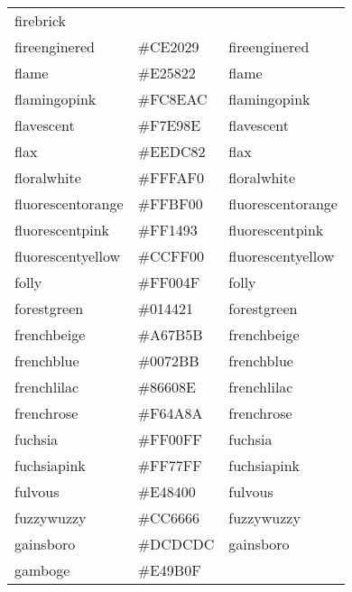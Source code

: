 \documentclass[
]{article}
\begin{document}
\begin{longtable}[]{@{}lll@{}}
\textcolor[rgb]{0.7,0.13,0.13}{firebrick             }\tabularnewline
fireenginered & \colorbox[rgb]{0.81,0.09,0.13}{\#CE2029} &
\textcolor[rgb]{0.81,0.09,0.13}{fireenginered         }\tabularnewline
flame & \colorbox[rgb]{0.89,0.35,0.13}{\#E25822} &
\textcolor[rgb]{0.89,0.35,0.13}{flame                 }\tabularnewline
flamingopink & \colorbox[rgb]{0.99,0.56,0.67}{\#FC8EAC} &
\textcolor[rgb]{0.99,0.56,0.67}{flamingopink          }\tabularnewline
flavescent & \colorbox[rgb]{0.97,0.91,0.56}{\#F7E98E} &
\textcolor[rgb]{0.97,0.91,0.56}{flavescent            }\tabularnewline
flax & \colorbox[rgb]{0.93,0.86,0.51}{\#EEDC82} &
\textcolor[rgb]{0.93,0.86,0.51}{flax                  }\tabularnewline
floralwhite & \colorbox[rgb]{1.0,0.98,0.94}{\#FFFAF0} &
\textcolor[rgb]{1.0,0.98,0.94}{floralwhite           }\tabularnewline
fluorescentorange & \colorbox[rgb]{1.0,0.75,0.0}{\#FFBF00} &
\textcolor[rgb]{1.0,0.75,0.0}{fluorescentorange     }\tabularnewline
fluorescentpink & \colorbox[rgb]{1.0,0.08,0.58}{\#FF1493} &
\textcolor[rgb]{1.0,0.08,0.58}{fluorescentpink       }\tabularnewline
fluorescentyellow & \colorbox[rgb]{0.8,1.0,0.0}{\#CCFF00} &
\textcolor[rgb]{0.8,1.0,0.0}{fluorescentyellow     }\tabularnewline
folly & \colorbox[rgb]{1.0,0.0,0.31}{\#FF004F} &
\textcolor[rgb]{1.0,0.0,0.31}{folly                 }\tabularnewline
forestgreen & \colorbox[rgb]{0.0,0.27,0.13}{\#014421} &
\textcolor[rgb]{0.0,0.27,0.13}{forestgreen           }\tabularnewline
frenchbeige & \colorbox[rgb]{0.65,0.48,0.36}{\#A67B5B} &
\textcolor[rgb]{0.65,0.48,0.36}{frenchbeige           }\tabularnewline
frenchblue & \colorbox[rgb]{0.0,0.45,0.73}{\#0072BB} &
\textcolor[rgb]{0.0,0.45,0.73}{frenchblue            }\tabularnewline
frenchlilac & \colorbox[rgb]{0.53,0.38,0.56}{\#86608E} &
\textcolor[rgb]{0.53,0.38,0.56}{frenchlilac           }\tabularnewline
frenchrose & \colorbox[rgb]{0.96,0.29,0.54}{\#F64A8A} &
\textcolor[rgb]{0.96,0.29,0.54}{frenchrose            }\tabularnewline
fuchsia & \colorbox[rgb]{1.0,0.0,1.0}{\#FF00FF} &
\textcolor[rgb]{1.0,0.0,1.0}{fuchsia               }\tabularnewline
fuchsiapink & \colorbox[rgb]{1.0,0.47,1.0}{\#FF77FF} &
\textcolor[rgb]{1.0,0.47,1.0}{fuchsiapink           }\tabularnewline
fulvous & \colorbox[rgb]{0.86,0.52,0.0}{\#E48400} &
\textcolor[rgb]{0.86,0.52,0.0}{fulvous               }\tabularnewline
fuzzywuzzy & \colorbox[rgb]{0.8,0.4,0.4}{\#CC6666} &
\textcolor[rgb]{0.8,0.4,0.4}{fuzzywuzzy            }\tabularnewline
gainsboro & \colorbox[rgb]{0.86,0.86,0.86}{\#DCDCDC} &
\textcolor[rgb]{0.86,0.86,0.86}{gainsboro             }\tabularnewline
gamboge & \colorbox[rgb]{0.89,0.61,0.06}{\#E49B0F} &

\end{longtable}
\end{document}
